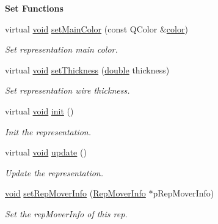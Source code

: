 \begin{Indent}{\bf Set Functions}\par
\begin{DoxyCompactItemize}
\item 
virtual \hyperlink{group___u_a_v_objects_plugin_ga444cf2ff3f0ecbe028adce838d373f5c}{void} \hyperlink{class_g_l_c___rep_mover_af7a9f120ac4ffd1f9c594cbe27380f25}{set\-Main\-Color} (const Q\-Color \&\hyperlink{glext_8h_a3ea846f998d64f079b86052b6c4193a8}{color})
\begin{DoxyCompactList}\small\item\em Set representation main color. \end{DoxyCompactList}\item 
virtual \hyperlink{group___u_a_v_objects_plugin_ga444cf2ff3f0ecbe028adce838d373f5c}{void} \hyperlink{class_g_l_c___rep_mover_ab3aef7841072957c683a0ca053a72a08}{set\-Thickness} (\hyperlink{_super_l_u_support_8h_a8956b2b9f49bf918deed98379d159ca7}{double} thickness)
\begin{DoxyCompactList}\small\item\em Set representation wire thickness. \end{DoxyCompactList}\item 
virtual \hyperlink{group___u_a_v_objects_plugin_ga444cf2ff3f0ecbe028adce838d373f5c}{void} \hyperlink{class_g_l_c___rep_mover_a353992e12e1197bdc323171f5bc50de0}{init} ()
\begin{DoxyCompactList}\small\item\em Init the representation. \end{DoxyCompactList}\item 
virtual \hyperlink{group___u_a_v_objects_plugin_ga444cf2ff3f0ecbe028adce838d373f5c}{void} \hyperlink{class_g_l_c___rep_mover_ac18cdf6f89e546e2982e363c6641c973}{update} ()
\begin{DoxyCompactList}\small\item\em Update the representation. \end{DoxyCompactList}\item 
\hyperlink{group___u_a_v_objects_plugin_ga444cf2ff3f0ecbe028adce838d373f5c}{void} \hyperlink{class_g_l_c___rep_mover_a85a4a89434378184ee210f983b29c2d5}{set\-Rep\-Mover\-Info} (\hyperlink{struct_g_l_c___rep_mover_1_1_rep_mover_info}{Rep\-Mover\-Info} $\ast$p\-Rep\-Mover\-Info)
\begin{DoxyCompactList}\small\item\em Set the rep\-Mover\-Info of this rep. \end{DoxyCompactList}\end{DoxyCompactItemize}
\end{Indent}
